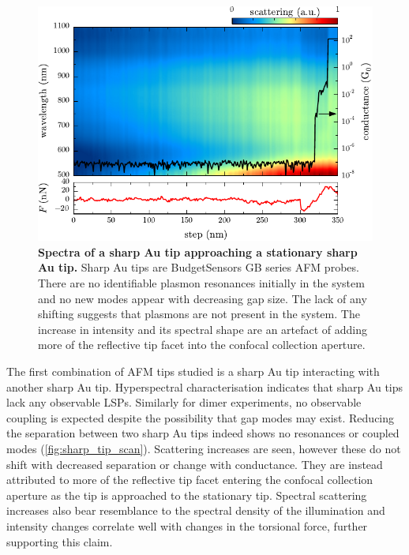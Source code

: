 \documentclass[a4paper]{article}
\begin{document}
\begin{figure}[bt]
\centering
\includegraphics{figures/sharp_au_tip_dimer_scan}
\caption[Spectra of a sharp Au tip approaching a stationary sharp Au tip]{\textbf{Spectra of a sharp Au tip approaching a stationary sharp Au tip.} Sharp Au tips are BudgetSensors GB series AFM probes. There are no identifiable plasmon resonances initially in the system and no new modes appear with decreasing gap size. The lack of any shifting suggests that plasmons are not present in the system. The increase in intensity and its spectral shape are an artefact of adding more of the reflective tip facet into the confocal collection aperture.}
\label{fig:sharp_tip_scan}
\end{figure}

The first combination of AFM tips studied is a sharp Au tip interacting with another sharp Au tip. Hyperspectral characterisation indicates that sharp Au tips lack any observable LSPs. Similarly for dimer experiments, no observable coupling is expected despite the possibility that gap modes may exist. Reducing the separation between two sharp Au tips indeed shows no resonances or coupled modes (\autoref{fig:sharp_tip_scan}). Scattering increases are seen, however these do not shift with decreased separation or change with conductance. They are instead attributed to more of the reflective tip facet entering the confocal collection aperture as the tip is approached to the stationary tip. Spectral scattering increases also bear resemblance to the spectral density of the illumination and intensity changes correlate well with changes in the torsional force, further supporting this claim.
\end{document}

